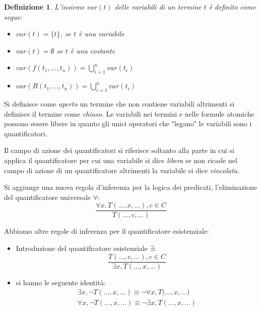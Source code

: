 \documentclass[a4paper]{report}
\newtheorem{defi}{Definizione}%
\begin{document}
\begin{defi}
    L'insieme $var(t)$ delle variabili di un termine $t$ è definito come segue:
    \begin{itemize}
        \item $var(t) = \{t \}$, se $t$ è una variabile
        \item $var(t) = \emptyset$ se $t$ è una costante
        \item $var(f(t_1,\dots,t_n)) = \bigcup _{i = 1} ^n var(t_i)$
        \item $var(R(t_1,\dots,t_n)) = \bigcup _{i = 1} ^ n var(t_i)$
    \end{itemize}
\end{defi}

Si definisce come \emph{aperto} un termine che non contiene variabili altrimenti
si definisce il termine come \emph{chiuso}.\newline
Le variabili nei termini e nelle formule atomiche possono essere libere
in quanto gli unici operatori che "legano" le variabili sono i quantificatori.

Il campo di azione dei quantificatori si riferisce soltanto alla parte in cui
si applica il quantificatore per cui una variabile si dice \emph{libera}
se non ricade nel campo di azione di un quantificatore altrimenti la variabile si dice \emph{vincolata}.

Si aggiunge una nuova regola d'inferenza per la logica dei predicati, l'eliminazione del quantificatore universale $\forall$:
\begin{equation*}
  \frac{\forall x, T(...,x,...), c\in C}{T(...,c,...)}
\end{equation*}

Abbiamo altre regole di inferenza per il quantificatore esistenziale:
\begin{itemize}
\item Introduzione del quantificatore esistenziale $\exists$:
  \begin{equation*}
    \frac{T(...,c,...), c\in C}{\exists x, T(...,x,...)}
  \end{equation*}
\item si hanno le seguente identità:
  \begin{equation*}
    \begin{split}
      \exists x, \neg T(...,x,...)\equiv \neg\forall x, T)...,x,...) \\
      \forall x, \neg T(...,x,...)\equiv \neg\exists x, T(...,x,...)\\
    \end{split}
  \end{equation*}
\end{itemize}
\end{document}
